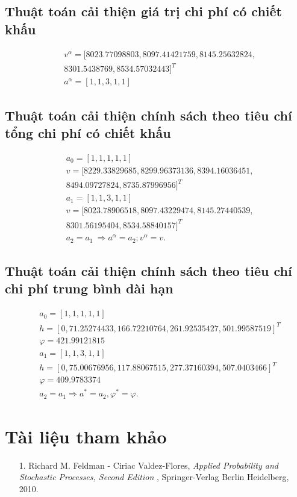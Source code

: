 \documentclass[12pt,a4paper]{report}
\begin{document}
	\section{Thuật toán cải thiện giá trị chi phí có chiết khấu}
	
	\begin{align*}
	&v^\alpha=[8023.77098803, 8097.41421759, 8145.25632824,\\ &8301.5438769,  8534.57032443]^T\\
	&a^\alpha=[1, 1 ,3 ,1, 1]
	\end{align*}

	
	\section{Thuật toán cải thiện chính sách theo tiêu chí tổng chi phí có chiết khấu}
	
	\begin{align*}
	&a_0=[1, 1, 1, 1, 1]\\
	&v=[8229.33829685, 8299.96373136, 8394.16036451,\\ &8494.09727824, 8735.87996956]^T\\
	&a_1=[1, 1, 3, 1, 1]\\
	&v=[8023.78906518, 8097.43229474, 8145.27440539,\\ &8301.56195404, 8534.58840157]^T\\
	&a_2=a_1 \ \Rightarrow a^\alpha=a_2; v^\alpha=v.
	\end{align*}

	\section{Thuật toán cải thiện chính sách theo tiêu chí chi phí trung bình dài hạn} 
	\begin{align*}
	&a_0=[1, 1, 1, 1, 1]\\
	&h=[  0     ,    71.25274433 ,166.72210764 ,261.92535427, 501.99587519]^T\\
	&\varphi=421.99121815\\
	&a_1=[1, 1, 3, 1, 1]\\
	&h=[  0        , 75.00676956 ,117.88067515 ,277.37160394, 507.0403466]^T\\
	&\varphi=409.9783374\\
	&a_2=a_1 \Rightarrow a^*=a_2, \varphi^*=\varphi.
	\end{align*}
	\chapter{Tài liệu tham khảo}
	\begin{itemize}
		\item[1.] Richard M. Feldman - Ciriac Valdez-Flores, \textit{Applied Probability and Stochastic Processes, Second Edition} , Springer-Verlag Berlin Heidelberg, 2010.
	\end{itemize}
	
\end{document}
